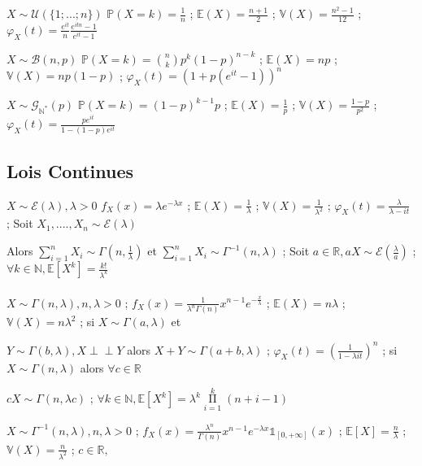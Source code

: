 \documentclass[12pt]{article}
\newcommand{\petitespace}{\vspace{0.5cm}}
\newcommand{\shift}{\hspace{2em}}
\newcommand{\bb}[1]{\mathbb{#1}} %
\newcommand{\R}{\bb{R}} %
\newcommand{\N}{\bb{N}}%
\newcommand{\produit}[2]{\mathop{\Pi}\limits_{#1}^{#2}}
\renewcommand{\cal}{\mathcal}
\newcommand{\bin}[2]{\mathcal{B}(#1,#2)} %
\newcommand{\Expo}[1]{\mathcal E(#1)}%
\newcommand{\gam}[2]{\Gamma(#1,#2)}%
\newcommand{\esp}[1]{\bb{ E} \mathopen{}\left[#1\right]} %
\newcommand{\Var}[1]{\bb{ V} \mathopen{}\left(#1\right)} %
\newcommand{\indep}{\perp \!\!\! \perp} %
\newcommand{\1}{\bb{1}} %
\begin{document}
$\boxed{X \sim \mathcal{U}(\{1;...;n\})}$ \shift $ \mathbb{P}(X=k)= \frac{1}{n}$ ; $ \mathbb{E}(X)= \frac{n+1}{2}$ ; $\mathbb{V}(X)=\frac{n^2-1}{12}$ ; $\varphi_X(t)=\frac{e^{it}}{n}\frac{e^{itn}-1}{e^{it}-1}$\vspace{2em}


$\boxed{X \sim \bin{n}{p}}$ $ \mathbb{P}(X=k)=\binom{n}{k}p^k(1-p)^{n-k}$ ; $ \mathbb{E}(X)=np$ ; $\mathbb{V}(X)=np(1-p)$ ; $\varphi_X(t)=(1+p(e^{it}-1))^n$\vspace{2em}


$\boxed{X \sim \mathcal{G}_\mathbb{N^*}(p)}$ \shift $\mathbb{P}(X=k)=(1-p)^{k-1}p$ ; $ \mathbb{E}(X)=\frac{1}{p}$ ; $\mathbb{V}(X)=\frac{1-p}{p^2}$ ;  $\varphi_X(t)= \frac{pe^{it}}{1-(1-p)e^{it}}$


\subsection{Lois Continues}

$\boxed{X \sim \cal{E}(\lambda),\lambda >0}$  $f_X(x)=\lambda e^{-\lambda x}$ ; $ \mathbb{E}(X)=\frac{1}{\lambda}$ ; $ \mathbb{V}(X)= \frac{1}{\lambda^2} $ ; $\varphi_X(t)=\frac{\lambda}{\lambda-it}$ ; Soit $X_1,....,X_n \sim  \mathcal{E}(\lambda) $ \petitespace

Alors $\sum\limits_{i=1}^nX_i \sim \gam{n}{\frac{1}{\lambda}}$ et $\sum\limits_{i=1}^nX_i \sim \Gamma^{-1}(n,\lambda)$ ; Soit $a\in \R, aX \sim \Expo{\frac{\lambda}{a}}$ ; $\forall k \in \N, \esp{X^k} = \frac{k!}{\lambda^k}$\\\\




$\boxed{X \sim \gam{n}{\lambda}, n, \lambda>0}$ ; $f_X(x)=\frac{1}{\lambda^n\Gamma(n)}x^{n-1}e^{-\frac{x}{\lambda}}$ ; $ \mathbb{E}(X)=n\lambda$ ; $ \mathbb{V}(X)=n\lambda^2$ ; si $X \sim \gam{a}{\lambda}$ et \petitespace

$Y\sim\gam{b}{\lambda}, X\indep Y$ alors $X+Y \sim \gam{a+b}{\lambda}$ ; $\varphi_X(t)=(\frac{1}{1-\lambda it})^n$ ;  si $X \sim \gam{n}{\lambda}$ alors $\forall c \in \bb{R}$ \petitespace

$cX \sim \gam{n}{\lambda c}$ ;
$\forall k \in \N, \esp{X^k}=\lambda^k\produit{i=1}{k}(n+i-1)$\vspace{2em}



$\boxed{X \sim \Gamma^{-1}(n,\lambda), n, \lambda>0}$ ; $f_X(x) = \frac{\lambda^n}{\Gamma(n)}x^{n-1}e^{-\lambda x}\1_{[0,+\infty]}(x)$ ; 
$\esp{X} = \frac n\lambda$ ; $\Var{X} = \frac{n}{\lambda^2}$ ; $c\in\R,$ \petitespace
\end{document}
